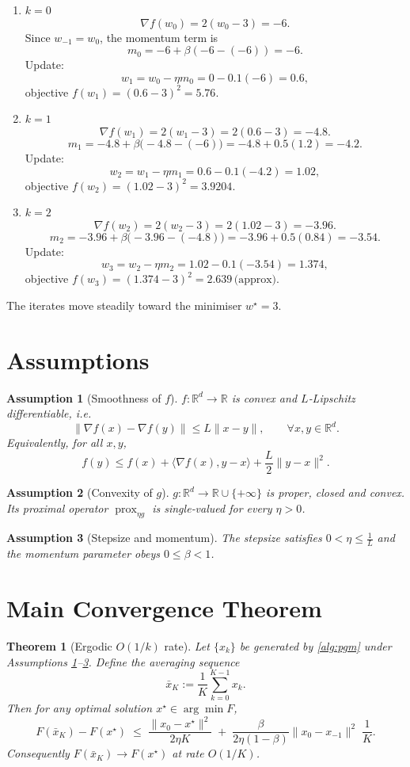\documentclass[12pt]{article}
\newtheorem{assumption}{Assumption}
\newtheorem{theorem}{Theorem}
\theoremstyle{definition}
\newcommand{\prox}{\operatorname{prox}}
\newcommand{\R}{\mathbb{R}}
\begin{document}
\begin{enumerate}[label=\textbf{Iter \arabic*.}]
\item $k=0$  
\[
\nabla f(w_{0})=2(w_{0}-3)=-6.
\] 
Since $w_{-1}=w_{0}$, the momentum term is  
\[
m_{0}= -6+\beta(-6-(-6))=-6.
\] 
Update:
\[
w_{1}=w_{0}-\eta m_{0}=0-0.1(-6)=0.6,
\] 
objective $f(w_{1})=(0.6-3)^{2}=5.76$.

\item $k=1$  
\[
\nabla f(w_{1})=2(w_{1}-3)=2(0.6-3)=-4.8.
\] 
\[
m_{1}= -4.8+\beta\bigl(-4.8-(-6)\bigr)
      =-4.8+0.5(1.2)=-4.2.
\] 
Update:
\[
w_{2}=w_{1}-\eta m_{1}=0.6-0.1(-4.2)=1.02,
\] 
objective $f(w_{2})=(1.02-3)^{2}=3.9204$.

\item $k=2$  
\[
\nabla f(w_{2})=2(w_{2}-3)=2(1.02-3)=-3.96.
\] 
\[
m_{2}= -3.96+\beta\bigl(-3.96-(-4.8)\bigr)
      =-3.96+0.5(0.84)=-3.54.
\] 
Update:
\[
w_{3}=w_{2}-\eta m_{2}=1.02-0.1(-3.54)=1.374,
\] 
objective $f(w_{3})=(1.374-3)^{2}=2.639\,\text{(approx)}$.
\end{enumerate}
The iterates move steadily toward the minimiser $w^{\star}=3$.

\newpage
\section*{Assumptions}
\begin{assumption}[Smoothness of $f$]\label{as:smooth}
$f:\R^{d}\to\R$ is convex and $L$‑Lipschitz differentiable, i.e.
\[
\|\nabla f(x)-\nabla f(y)\|\le L\|x-y\|,\qquad\forall x,y\in\R^{d}.
\]
Equivalently, for all $x,y$,
\[
f(y)\le f(x)+\langle\nabla f(x),y-x\rangle+\frac{L}{2}\|y-x\|^{2}.
\tag{2}
\]
\end{assumption}

\begin{assumption}[Convexity of $g$]\label{as:g}
$g:\R^{d}\to\R\cup\{+\infty\}$ is proper, closed and convex. Its proximal operator
$\prox_{\eta g}$ is single‑valued for every $\eta>0$.
\end{assumption}

\begin{assumption}[Stepsize and momentum]\label{as:param}
The stepsize satisfies $0<\eta\le \frac{1}{L}$ and the momentum parameter obeys $0\le\beta<1$.
\end{assumption}

\section*{Main Convergence Theorem}
\begin{theorem}[Ergodic $O(1/k)$ rate]\label{thm:rate}
Let $\{x_{k}\}$ be generated by \eqref{alg:pgm} under Assumptions \ref{as:smooth}–\ref{as:param}.
Define the averaging sequence
\[
\bar{x}_{K}:=\frac{1}{K}\sum_{k=0}^{K-1}x_{k}.
\]
Then for any optimal solution $x^{\star}\in\arg\min F$,
\[
F(\bar{x}_{K})-F(x^{\star})\;\le\;
\frac{\|x_{0}-x^{\star}\|^{2}}{2\eta K}
\;+\;
\frac{\beta}{2\eta(1-\beta)}\|x_{0}-x_{-1}\|^{2}\;\frac{1}{K}.
\tag{3}
\]
Consequently $F(\bar{x}_{K})\to F(x^{\star})$ at rate $O(1/K)$.
\end{theorem}
\end{document}

